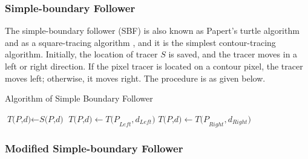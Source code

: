 \subsubsection{Simple-boundary Follower}


The simple-boundary follower (SBF) is also known as Papert's turtle algorithm \JHMEMO{[4]} and as a square-tracing algorithm \JHMEMO{[7]}, and it is the simplest contour-tracing algorithm. Initially, the location of tracer $S$ is saved, and the tracer moves in a left or right direction. If the pixel tracer is located on a contour pixel, the tracer moves left; otherwise, it moves right. The procedure is as given below.

\begin{algorithm}
	\caption{Algorithm of Simple Boundary Follower}\label{alg:sbf}
	\begin{algorithmic}[1]
	\State $\textit{T(P,d)} \gets \textit{S(P,d)}$
	\Do
	\State $\textit{T(P,d)} \gets \textit{T(P}_{Left},\textit{d}_{Left} )  $
	\Else
	\State $\textit{T(P,d)} \gets \textit{T(P}_{Right},\textit{d}_{Right})$
	\EndIf
	\EndProcedure
	\end{algorithmic}
\end{algorithm}

\subsubsection{Modified Simple-boundary Follower}


